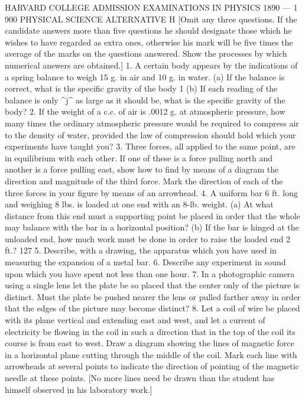 HARVARD COLLEGE
ADMISSION EXAMINATIONS IN PHYSICS
1890 — 1 900
PHYSICAL SCIENCE
ALTERNATIVE H
[Omit any three questions. If the candidate answers more than five questions he should designate those which he wishes to have regarded as extra ones, otherwise his mark will be five times the average of the marks on the questions answered. Show the processes by which numerical answers are obtained.]
1. A certain body appears by the indications of a spring balance to weigh 15 g. in air and 10 g. in water.
(a) If the balance is correct, what is the specific gravity of the body 1
(b) If each reading of the balance is only ^j^ as large as it should be, what is the specific gravity of the body?
2. If the weight of a c.c. of air is .0012 g. at atmospheric pressure, how many times the ordinary atmospheric pressure would be required to compress air to the density of water, provided the law of compression should hold which your experiments have taught you?
3. Three forces, all applied to the same point, are in equilibrium with each other. If one of these is a force pulling north and another is a force pulling east, show how to find by means of a diagram the direction and magnitude of the third force. Mark the direction of each of the three forces in your figure by means of an arrowhead.
4. A uniform bar 6 ft. long and weighing 8 lbs. is loaded at one end with an 8-lb. weight.
(a) At what distance from this end must a supporting point be placed in order that the whole may balance with the bar in a horizontal position?
(b) If the bar is hinged at the unloaded end, how much work must be done in order to raise the loaded end 2 ft.?
127
5. Describe, with a drawing, the apparatus which you have used in measuring the expansion of a metal bar.
6. Describe any experiment in sound upon which you have spent not less than one hour.
7. In a photographic camera using a single lens let the plate be so placed that the center only of the picture is distinct. Must the plate be pushed nearer the lens or pulled farther away in order that the edges of the picture may become distinct?
8. Let a coil of wire be placed with its plane vertical and extending east and west, and let a current of electricity be flowing in the coil in such a direction that in the top of the coil its course is from east to west. Draw a diagram showing the lines of magnetic force in a horizontal plane cutting through the middle of the coil. Mark each line with arrowheads at several points to indicate the direction of pointing of the magnetic needle at these points. [No more lines need be drawn than the student has himself observed in his laboratory work.]
